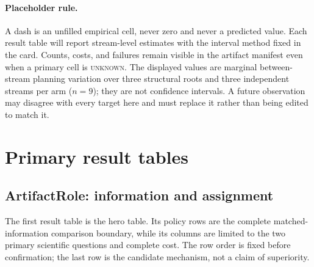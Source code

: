 \documentclass[sigconf,anonymous]{aamas}
\newcommand{\unknown}{\textsc{unknown}}
\begin{document}
\paragraph{Placeholder rule.} A dash is an unfilled empirical cell, never zero and never a predicted value. Each result table will report stream-level estimates with the interval method fixed in the card. Counts, costs, and failures remain visible in the artifact manifest even when a primary cell is \unknown{}. The displayed \pm values are marginal between-stream planning variation over three structural roots and three independent streams per arm ($n=9$); they are not confidence intervals. A future observation may disagree with every target here and must replace it rather than being edited to match it.

\section{Primary result tables}

\subsection{ArtifactRole: information and assignment}

The first result table is the hero table. Its policy rows are the complete matched-information comparison boundary, while its columns are limited to the two primary scientific questions and complete cost. The row order is fixed before confirmation; the last row is the candidate mechanism, not a claim of superiority.
\end{document}
